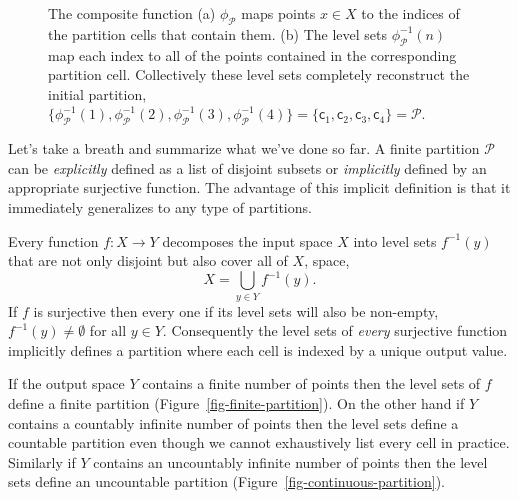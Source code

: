 \documentclass[
  letterpaper,
  DIV=11,
  numbers=noendperiod]{scrartcl}
\begin{document}
\begin{figure}
\begin{minipage}{0.50\linewidth}
\end{minipage}%

\caption{\label{fig-index-level-sets}The composite function (a)
\(\phi_{\mathcal{P}}\) maps points \(x \in X\) to the indices of the
partition cells that contain them. (b) The level sets
\(\phi_{\mathcal{P}}^{-1}(n)\) map each index to all of the points
contained in the corresponding partition cell. Collectively these level
sets completely reconstruct the initial partition,
\(\{ \phi_{\mathcal{P}}^{-1}(1), \phi_{\mathcal{P}}^{-1}(2),
   \phi_{\mathcal{P}}^{-1}(3), \phi_{\mathcal{P}}^{-1}(4) \}
= \{ \mathsf{c}_{1}, \mathsf{c}_{2}, \mathsf{c}_{3}, \mathsf{c}_{4} \}
= \mathcal{P}\).}

\end{figure}%

Let's take a breath and summarize what we've done so far. A finite
partition \(\mathcal{P}\) can be \emph{explicitly} defined as a list of
disjoint subsets or \emph{implicitly} defined by an appropriate
surjective function. The advantage of this implicit definition is that
it immediately generalizes to any type of partitions.

Every function \(f : X \rightarrow Y\) decomposes the input space \(X\)
into level sets \(f^{-1}(y)\) that are not only disjoint but also cover
all of \(X\), space, \[
X = \bigcup_{y \in Y} f^{-1}(y).
\] If \(f\) is surjective then every one if its level sets will also be
non-empty, \(f^{-1}(y) \ne \emptyset\) for all \(y \in Y\). Consequently
the level sets of \emph{every} surjective function implicitly defines a
partition where each cell is indexed by a unique output value.

If the output space \(Y\) contains a finite number of points then the
level sets of \(f\) define a finite partition
(Figure~\ref{fig-finite-partition}). On the other hand if \(Y\) contains
a countably infinite number of points then the level sets define a
countable partition even though we cannot exhaustively list every cell
in practice. Similarly if \(Y\) contains an uncountably infinite number
of points then the level sets define an uncountable partition
(Figure~\ref{fig-continuous-partition}).
\end{document}
